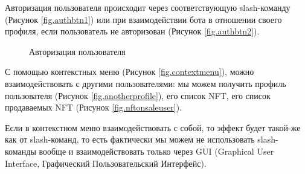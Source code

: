 Авторизация пользователя происходит через соответствующую slash-команду (Рисунок {\color{blue} \ref{fig.authbtn1}}) или при взаимодействии бота в отношении своего профиля, если пользователь не авторизован (Рисунок {\color{blue} \ref{fig.authbtn2}}).

\begin{figure}
    \centering
    \caption{Авторизация пользователя}
\end{figure}

С помощью контекстных меню (Рисунок {\color{blue} \ref{fig.contextmenu}}), можно взаимодействовать с другими пользователями: мы можем получить профиль пользователя (Рисунок {\color{blue} \ref{fig.anotherprofile}}), его список NFT, его список продаваемых NFT (Рисунок {\color{blue} \ref{fig.nftonsaleuser}}).

\begin{remark}
    Если в контекстном меню взаимодействовать с собой, то эффект будет такой-же как от slash-команд, то есть фактически мы можем не использовать slash-команды вообще и взаимодействовать только через GUI (Graphical User Interface, Графический Пользовательский Интерфейс).
\end{remark}

